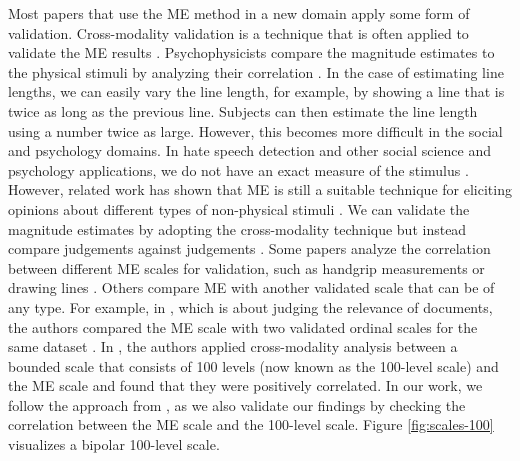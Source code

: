 %
Most papers that use the ME method in a new domain apply some form of validation. Cross-modality validation is a technique that is often applied to validate the ME results \citep{bard1996magnitude}.
%
Psychophysicists compare the magnitude estimates to the physical stimuli by analyzing their correlation \citep{bard1996magnitude}.
%
In the case of estimating line lengths, we can easily vary the line length, for example, by showing a line that is twice as long as the previous line.
%
Subjects can then estimate the line length using a number twice as large.
%
However, this becomes more difficult in the social and psychology domains.
%
In hate speech detection and other social science and psychology applications, we do not have an exact measure of the stimulus \citep{bard1996magnitude}.
%
However, related work has shown that ME is still a suitable technique for eliciting opinions about different types of non-physical stimuli \citep{bard1996magnitude, mcgee2004master, maddalena2017crowdsourcing, lodge1979comparisons}.
%
We can validate the magnitude estimates by adopting the cross-modality technique but instead compare judgements against judgements \citep{bard1996magnitude, lodge1979comparisons}.
%
Some papers analyze the correlation between different ME scales for validation, such as handgrip measurements or drawing lines \citep{bard1996magnitude, lodge1976calibration}.
%
Others compare ME with another validated scale that can be of any type.
%
For example, in \citet{maddalena2017crowdsourcing}, which is about judging the relevance of documents, the authors compared the ME scale with two validated ordinal scales for the same dataset \citep{maddalena2017crowdsourcing}.
%
In \citet{roitero2018fine}, the authors applied cross-modality analysis between a bounded scale that consists of 100 levels (now known as the 100-level scale) and the ME scale and found that they were positively correlated.
%
In our work, we follow the approach from \citet{roitero2018fine}, as we also validate our findings by checking the correlation between the ME scale and the 100-level scale.
%
Figure \ref{fig:scales-100} visualizes a bipolar 100-level scale.